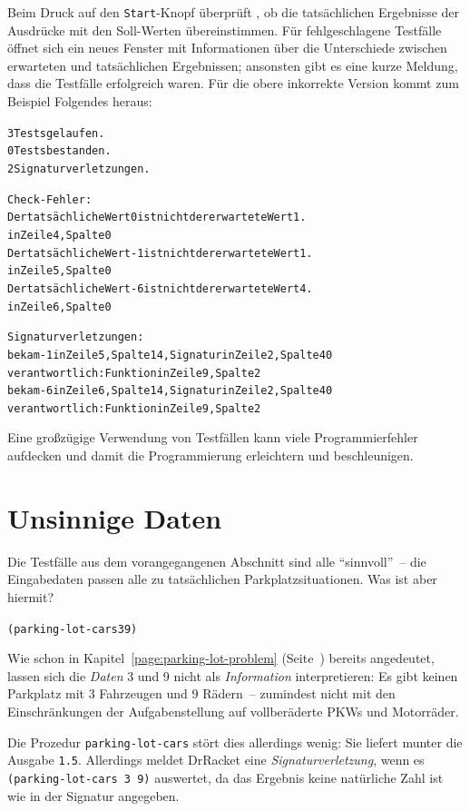 Beim Druck auf den \texttt{Start}-Knopf überprüft \drscheme{}, ob die
tatsächlichen Ergebnisse der Ausdrücke mit den Soll-Werten
übereinstimmen.  Für fehlgeschlagene Testfälle öffnet sich ein neues Fenster
mit Informationen über die Unterschiede zwischen erwarteten und
tatsächlichen Ergebnissen; ansonsten gibt es eine kurze Meldung, dass die
Testfälle erfolgreich waren.  Für die obere inkorrekte Version kommt
zum Beispiel Folgendes heraus:
%
\begin{alltt}
3 Tests gelaufen.
0 Tests bestanden.
2 Signaturverletzungen.

Check-Fehler:
	Der tatsächliche Wert 0 ist nicht der erwartete Wert 1.
in Zeile 4, Spalte 0 
	Der tatsächliche Wert -1 ist nicht der erwartete Wert 1.
in Zeile 5, Spalte 0 
	Der tatsächliche Wert -6 ist nicht der erwartete Wert 4.
in Zeile 6, Spalte 0 

Signaturverletzungen:
	bekam -1 in Zeile 5, Spalte 14 , Signatur in Zeile 2, Spalte 40 
	verantwortlich: Funktion in Zeile 9, Spalte 2 
	bekam -6 in Zeile 6, Spalte 14 , Signatur in Zeile 2, Spalte 40 
	verantwortlich: Funktion in Zeile 9, Spalte 2 
\end{alltt}
%
Eine großzügige Verwendung
von Testfällen kann viele Programmierfehler
aufdecken und damit die Programmierung erleichtern und beschleunigen.

\begin{mantra}[Testfälle]\label{mantra:test}

\end{mantra}


\section{Unsinnige Daten}
\label{sec:nonsensical-data-prequel}

Die Testfälle aus dem vorangegangenen Abschnitt sind alle
"`sinnvoll"'~-- die Eingabedaten passen alle zu tatsächlichen
Parkplatzsituationen.  Was ist aber hiermit?
%
\begin{alltt}
(parking-lot-cars 3 9)
\end{alltt}
%
Wie schon in Kapitel~\ref{page:parking-lot-problem}
(Seite~\pageref{page:parking-lot-problem}) bereits angedeutet, 
lassen sich die \emph{Daten} 3 und 9 nicht als \emph{Information}
interpretieren: Es gibt keinen Parkplatz mit 3 Fahrzeugen und 9
Rädern~-- zumindest nicht mit den Einschränkungen der Aufgabenstellung
auf vollberäderte PKWs und Motorräder.

Die Prozedur \texttt{parking-lot-cars} stört dies allerdings wenig:
Sie liefert munter die Ausgabe \texttt{1.5}.  Allerdings meldet
DrRacket eine \textit{Signaturverletzung},
wenn es \texttt{(parking-lot-cars 3 9)} auswertet, da das Ergebnis
keine natürliche Zahl ist wie in der Signatur angegeben.  

